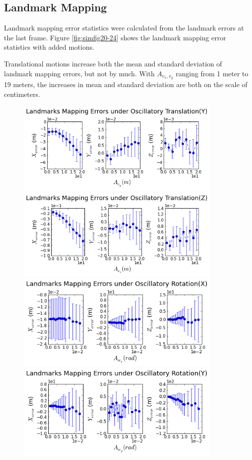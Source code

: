 \subsection{Landmark Mapping}\label{sec:landmarkMotion}
Landmark mapping error statistics were calculated from the landmark
errors at the last frame. Figure \ref{fig:simfig20-24} shows the
landmark mapping error statistics with added motions. 

Translational motions increase both the mean and standard deviation
of landmark mapping errors, but not by much. With $A_{v_x, v_y}$
ranging from 1 meter to 19 meters, the increases in mean and standard
deviation are both on the scale of centimeters.

\begin{figure}[h]
  \centering
  \includegraphics[width=10cm, keepaspectratio=true]{./Figures/SimulationFigures/Figure20.png}
  \includegraphics[width=10cm, keepaspectratio=true]{./Figures/SimulationFigures/Figure21.png}
  \includegraphics[width=10cm, keepaspectratio=true]{./Figures/SimulationFigures/Figure22.png}
  \includegraphics[width=10cm, keepaspectratio=true]{./Figures/SimulationFigures/Figure23.png}

\end{figure}
